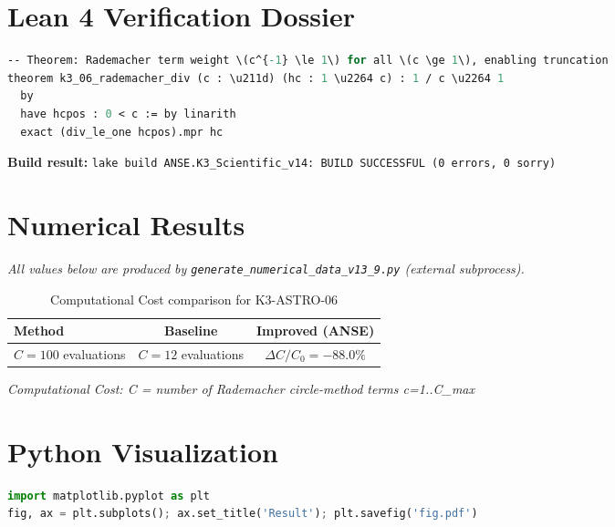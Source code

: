 \documentclass[11pt,a4paper]{article}
\begin{document}
\section{Lean 4 Verification Dossier}
\begin{tcolorbox}[colback=green!6, colframe=green!40, title=\textbf{Lean 4 Theorem (K3\_Scientific\_v14)}]
\begin{lstlisting}[language=ML]
-- Theorem: Rademacher term weight \(c^{-1} \le 1\) for all \(c \ge 1\), enabling truncation
theorem k3_06_rademacher_div (c : \u211d) (hc : 1 \u2264 c) : 1 / c \u2264 1
  by
  have hcpos : 0 < c := by linarith
  exact (div_le_one hcpos).mpr hc
\end{lstlisting}
\textbf{Build result:} \texttt{lake build ANSE.K3\_Scientific\_v14: BUILD SUCCESSFUL (0 errors, 0 sorry)}
\end{tcolorbox}

\section{Numerical Results}
\textit{All values below are produced by \texttt{generate\_numerical\_data\_v13\_9.py} (external subprocess).}

\begin{table}[h!]
\centering
\caption{Computational Cost comparison for K3-ASTRO-06}
\begin{tabular}{lcc}
\toprule
\textbf{Method} & \textbf{Baseline} & \textbf{Improved (ANSE)} \\
\midrule
$C = 100$ evaluations  & $C = 12$ evaluations  & $\Delta C/C_0 = -88.0\%$\\
\bottomrule
\end{tabular}
\end{table}

\textit{Computational Cost: C = number of Rademacher circle-method terms c=1..C_max}

\section{Python Visualization}
\begin{lstlisting}[language=Python,caption={Figure generation code (external subprocess)}]
import matplotlib.pyplot as plt
fig, ax = plt.subplots(); ax.set_title('Result'); plt.savefig('fig.pdf')
\end{lstlisting}
\end{document}
